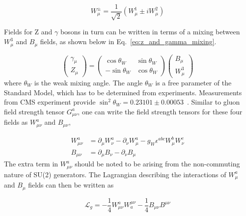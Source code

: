 \begin{equation}
    W^{\pm}_{\mu} = \frac{1}{\sqrt{2}} \left( W^{1}_{\mu} \pm i W^{2}_{\mu} \right)
\end{equation}

Fields for $\textrm{Z}$ and $\gamma$ bosons in turn can be written in terms of a mixing between $W_{\mu}^{3}$ and $B_{\mu}$ fields, 
as shown below in Eq.~\ref{eq:z_and_gamma_mixing}.

\begin{equation}
    \begin{pmatrix}
        \gamma_{\mu} \\ Z_{\mu}
    \end{pmatrix}
    = 
    \begin{pmatrix}
        \cos \theta_{W} & \sin \theta_{W} \\ 
        - \sin \theta_{W} & \cos \theta_{W}
    \end{pmatrix}
    \begin{pmatrix}
        B_{\mu} \\ W^{3}_{\mu}
    \end{pmatrix}
    \label{eq:z_and_gamma_mixing}
\end{equation}
where $\theta_{W}$ is the weak mixing angle. The angle $\theta_{W}$ is a free parameter of the Standard Model, which has to be determined
from experiments. Measurements from CMS experiment provide  
$\sin^2 \theta_{W} = 0.23101 \pm 0.00053$~\cite{CMS:WeakMixingAngleMeasurement}.
Similar to gluon field strength tensor $G_{\mu\nu}^{a}$, one can write the field strength tensors for these four fields 
as $W_{\mu\nu}^{a}$ and $B_{\mu\nu}$,

\begin{equation}
    \begin{split}
        W_{\mu\nu}^{a} &= \partial_{\mu} W_{\nu}^{a} - \partial_{\nu} W_{\mu}^{a} - g_{W} \epsilon^{abc} W_{\mu}^{b} W_{\nu}^{c} \\
        B_{\mu\nu}     &= \partial_{\mu} B_{\nu}     - \partial_{\nu} B_{\mu}
    \end{split}
    \label{eq:field_strength_ew}
\end{equation}
The extra term in $W_{\mu\nu}^{a}$ should be noted to be arising from the non-commuting nature of SU(2) generators.
The Lagrangian describing the interactions of $W_{\mu}^{a}$ and $B_{\mu}$ fields can then be written as

\begin{equation}
    \mathcal{L}_{g} = -\frac{1}{4} W_{\mu\nu}^{a} W^{\mu\nu}_{a} -\frac{1}{4} B_{\mu\nu} B^{\mu\nu}
    \label{eq:lagrangian_kinetic_term}
\end{equation}

